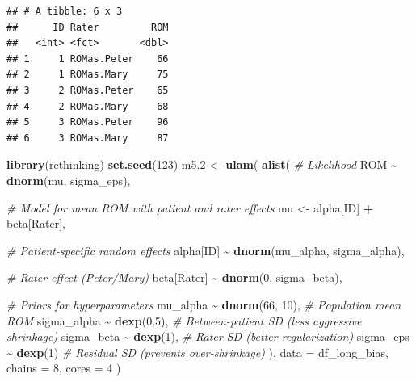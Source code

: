 \documentclass[
]{book}
\newenvironment{Shaded}{\begin{snugshade}}{\end{snugshade}}
\newcommand{\AttributeTok}[1]{\textcolor[rgb]{0.13,0.29,0.53}{#1}}
\newcommand{\CommentTok}[1]{\textcolor[rgb]{0.56,0.35,0.01}{\textit{#1}}}
\newcommand{\DecValTok}[1]{\textcolor[rgb]{0.00,0.00,0.81}{#1}}
\newcommand{\FloatTok}[1]{\textcolor[rgb]{0.00,0.00,0.81}{#1}}
\newcommand{\FunctionTok}[1]{\textcolor[rgb]{0.13,0.29,0.53}{\textbf{#1}}}
\newcommand{\NormalTok}[1]{#1}
\newcommand{\OtherTok}[1]{\textcolor[rgb]{0.56,0.35,0.01}{#1}}
\newcommand{\SpecialCharTok}[1]{\textcolor[rgb]{0.81,0.36,0.00}{\textbf{#1}}}
\begin{document}
\begin{verbatim}
## # A tibble: 6 x 3
##      ID Rater         ROM
##   <int> <fct>       <dbl>
## 1     1 ROMas.Peter    66
## 2     1 ROMas.Mary     75
## 3     2 ROMas.Peter    65
## 4     2 ROMas.Mary     68
## 5     3 ROMas.Peter    96
## 6     3 ROMas.Mary     87
\end{verbatim}

\begin{Shaded}
\begin{Highlighting}[]
\FunctionTok{library}\NormalTok{(rethinking)}
\FunctionTok{set.seed}\NormalTok{(}\DecValTok{123}\NormalTok{)}
\NormalTok{m5}\FloatTok{.2} \OtherTok{\textless{}{-}} \FunctionTok{ulam}\NormalTok{(}
  \FunctionTok{alist}\NormalTok{(}
    \CommentTok{\# Likelihood}
\NormalTok{    ROM }\SpecialCharTok{\textasciitilde{}} \FunctionTok{dnorm}\NormalTok{(mu, sigma\_eps),}
    
    \CommentTok{\# Model for mean ROM with patient and rater effects}
\NormalTok{    mu }\OtherTok{\textless{}{-}}\NormalTok{ alpha[ID] }\SpecialCharTok{+}\NormalTok{ beta[Rater],  }
    
    \CommentTok{\# Patient{-}specific random effects}
\NormalTok{    alpha[ID] }\SpecialCharTok{\textasciitilde{}} \FunctionTok{dnorm}\NormalTok{(mu\_alpha, sigma\_alpha),  }
    
    \CommentTok{\# Rater effect (Peter/Mary)}
\NormalTok{    beta[Rater] }\SpecialCharTok{\textasciitilde{}} \FunctionTok{dnorm}\NormalTok{(}\DecValTok{0}\NormalTok{, sigma\_beta),  }
    
    \CommentTok{\# Priors for hyperparameters}
\NormalTok{    mu\_alpha }\SpecialCharTok{\textasciitilde{}} \FunctionTok{dnorm}\NormalTok{(}\DecValTok{66}\NormalTok{, }\DecValTok{10}\NormalTok{),  }\CommentTok{\# Population mean ROM}
\NormalTok{    sigma\_alpha }\SpecialCharTok{\textasciitilde{}} \FunctionTok{dexp}\NormalTok{(}\FloatTok{0.5}\NormalTok{),  }\CommentTok{\# Between{-}patient SD (less aggressive shrinkage)}
\NormalTok{    sigma\_beta }\SpecialCharTok{\textasciitilde{}} \FunctionTok{dexp}\NormalTok{(}\DecValTok{1}\NormalTok{),   }\CommentTok{\# Rater SD (better regularization)}
\NormalTok{    sigma\_eps }\SpecialCharTok{\textasciitilde{}} \FunctionTok{dexp}\NormalTok{(}\DecValTok{1}\NormalTok{)     }\CommentTok{\# Residual SD (prevents over{-}shrinkage)}
\NormalTok{  ), }
  \AttributeTok{data =}\NormalTok{ df\_long\_bias, }
  \AttributeTok{chains =} \DecValTok{8}\NormalTok{, }\AttributeTok{cores =} \DecValTok{4}
\NormalTok{)}
\end{Highlighting}
\end{Shaded}
\end{document}
